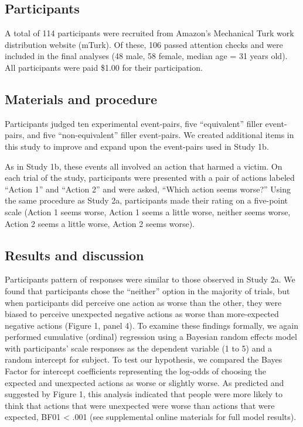\documentclass[10pt, letterpaper]{article}
\begin{document}
\subsection{Participants}\label{participants-3}

A total of 114 participants were recruited from Amazon's Mechanical Turk
work distribution website (mTurk). Of these, 106 passed attention checks
and were included in the final analyses (48 male, 58 female, median age
= 31 years old). All participants were paid \$1.00 for their
participation.

\subsection{Materials and procedure}\label{materials-and-procedure-3}

Participants judged ten experimental event-pairs, five ``equivalent''
filler event-pairs, and five ``non-equivalent'' filler event-pairs. We
created additional items in this study to improve and expand upon the
event-pairs used in Study 1b.

As in Study 1b, these events all involved an action that harmed a
victim. On each trial of the study, participants were presented with a
pair of actions labeled ``Action 1'' and ``Action 2'' and were asked,
``Which action seems worse?'' Using the same procedure as Study 2a,
participants made their rating on a five-point scale (Action 1 seems
worse, Action 1 seems a little worse, neither seems worse, Action 2
seems a little worse, Action 2 seems worse).

\subsection{Results and discussion}\label{results-and-discussion-3}

Participants pattern of responses were similar to those observed in
Study 2a. We found that participants chose the ``neither'' option in the
majority of trials, but when participants did perceive one action as
worse than the other, they were biased to perceive unexpected negative
actions as worse than more-expected negative actions (Figure 1, panel
4). To examine these findings formally, we again performed cumulative
(ordinal) regression using a Bayesian random effects model with
participants' scale responses as the dependent variable (1 to 5) and a
random intercept for subject. To test our hypothesis, we compared the
Bayes Factor for intercept coefficients representing the log-odds of
choosing the expected and unexpected actions as worse or slightly worse.
As predicted and suggested by Figure 1, this analysis indicated that
people were more likely to think that actions that were unexpected were
worse than actions that were expected, BF01 \textless{} .001 (see
supplemental online materials for full model results).
\end{document}
